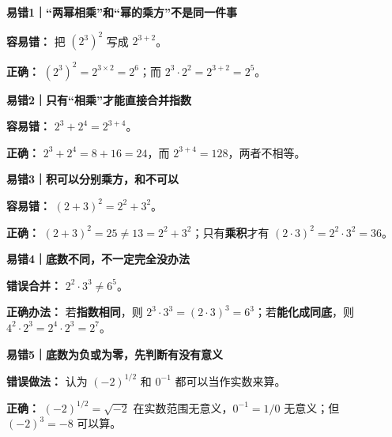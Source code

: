 \begin{trapbox}
    \textbf{\textcolor{CTrap}{易错1｜“两幂相乘”和“幂的乘方”不是同一件事}}\par
    \textbf{容易错：} 把 $(2^3)^2$ 写成 $2^{3+2}$。\par
    \textbf{正确：} $(2^3)^2=2^{3\times2}=2^6$；而 $2^3\cdot2^2=2^{3+2}=2^5$。
    \begin{center}
    
    \end{center}

    \medskip
    \textbf{\textcolor{CTrap}{易错2｜只有“相乘”才能直接合并指数}}\par
    \textbf{容易错：} $2^3+2^4=2^{3+4}$。\par
    \textbf{正确：} $2^3+2^4=8+16=24$，而 $2^{3+4}=128$，两者不相等。
    \begin{center}
    
    \end{center}

    \medskip
    \textbf{\textcolor{CTrap}{易错3｜积可以分别乘方，和不可以}}\par
    \textbf{容易错：} $(2+3)^2=2^2+3^2$。\par
    \textbf{正确：} $(2+3)^2=25\ne13=2^2+3^2$；只有\textbf{乘积}才有 $(2\cdot3)^2=2^2\cdot3^2=36$。
    \begin{center}
    
    \end{center}

    \medskip
    \textbf{\textcolor{CTrap}{易错4｜底数不同，不一定完全没办法}}\par
    \textbf{错误合并：} $2^2\cdot3^3\ne6^5$。\par
    \textbf{正确办法：} 若\textbf{指数相同}，则 $2^3\cdot3^3=(2\cdot3)^3=6^3$；若\textbf{能化成同底}，则 $4^2\cdot2^3=2^4\cdot2^3=2^7$。
    \begin{center}
    
    \end{center}

    \medskip
    \textbf{\textcolor{CTrap}{易错5｜底数为负或为零，先判断有没有意义}}\par
    \textbf{错误做法：} 认为 $(-2)^{1/2}$ 和 $0^{-1}$ 都可以当作实数来算。\par
    \textbf{正确：} $(-2)^{1/2}=\sqrt{-2}$ 在实数范围无意义，$0^{-1}=1/0$ 无意义；但 $(-2)^3=-8$ 可以算。
    \begin{center}
    
    \end{center}
\end{trapbox}
